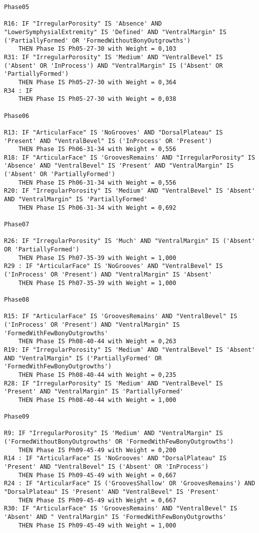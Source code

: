 \begin{lstlisting}
Phase05

R16: IF "IrregularPorosity" IS 'Absence' AND "LowerSymphysialExtremity" IS 'Defined' AND "VentralMargin" IS ('PartiallyFormed' OR 'FormedWithoutBonyOutgrowths')
	THEN Phase IS Ph05-27-30 with Weight = 0,103
R31: IF "IrregularPorosity" IS 'Medium' AND "VentralBevel" IS ('Absent' OR 'InProcess') AND "VentralMargin" IS ('Absent' OR 'PartiallyFormed')
	THEN Phase IS Ph05-27-30 with Weight = 0,364
R34 : IF
	THEN Phase IS Ph05-27-30 with Weight = 0,038

Phase06

R13: IF "ArticularFace" IS 'NoGrooves' AND "DorsalPlateau" IS 'Present' AND "VentralBevel" IS ('InProcess' OR 'Present')
	THEN Phase IS Ph06-31-34 with Weight = 0,556
R18: IF "ArticularFace" IS 'GroovesRemains' AND "IrregularPorosity" IS 'Absence' AND "VentralBevel" IS 'Present' AND "VentralMargin" IS ('Absent' OR 'PartiallyFormed')
	THEN Phase IS Ph06-31-34 with Weight = 0,556
R20: IF "IrregularPorosity" IS 'Medium' AND "VentralBevel" IS 'Absent' AND "VentralMargin" IS 'PartiallyFormed'
	THEN Phase IS Ph06-31-34 with Weight = 0,692

Phase07

R26: IF "IrregularPorosity" IS 'Much' AND "VentralMargin" IS ('Absent' OR 'PartiallyFormed')
	THEN Phase IS Ph07-35-39 with Weight = 1,000
R29 : IF "ArticularFace" IS 'NoGrooves' AND "VentralBevel" IS ('InProcess' OR 'Present') AND "VentralMargin" IS 'Absent'
	THEN Phase IS Ph07-35-39 with Weight = 1,000

Phase08

R15: IF "ArticularFace" IS 'GroovesRemains' AND "VentralBevel" IS ('InProcess' OR 'Present') AND "VentralMargin" IS 'FormedWithFewBonyOutgrowths'
	THEN Phase IS Ph08-40-44 with Weight = 0,263
R19: IF "IrregularPorosity" IS 'Medium' AND "VentralBevel" IS 'Absent' AND "VentralMargin" IS ('PartiallyFormed' OR 'FormedWithFewBonyOutgrowths')
	THEN Phase IS Ph08-40-44 with Weight = 0,235
R28: IF "IrregularPorosity" IS 'Medium' AND "VentralBevel" IS 'Present' AND "VentralMargin" IS 'PartiallyFormed'
	THEN Phase IS Ph08-40-44 with Weight = 1,000

Phase09

R9: IF "IrregularPorosity" IS 'Medium' AND "VentralMargin" IS ('FormedWithoutBonyOutgrowths' OR 'FormedWithFewBonyOutgrowths')
	THEN Phase IS Ph09-45-49 with Weight = 0,200
R14 : IF "ArticularFace" IS 'NoGrooves' AND "DorsalPlateau" IS 'Present' AND "VentralBevel" IS ('Absent' OR 'InProcess')
	THEN Phase IS Ph09-45-49 with Weight = 0,667
R24 : IF "ArticularFace" IS ('GroovesShallow' OR 'GroovesRemains') AND "DorsalPlateau" IS 'Present' AND "VentralBevel" IS 'Present'
	THEN Phase IS Ph09-45-49 with Weight = 0,667
R30: IF "ArticularFace" IS 'GroovesRemains' AND "VentralBevel" IS 'Absent' AND " VentralMargin" IS 'FormedWithFewBonyOutgrowths'
	THEN Phase IS Ph09-45-49 with Weight = 1,000


\end{lstlisting}
